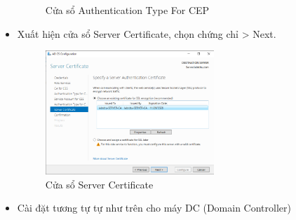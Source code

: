 \documentclass[13pt]{report}
\begin{document}
\begin{itemize}
\begin{figure}[htp]
			\caption{Cửa sổ Authentication Type For CEP}
		\end{figure}
		\newpage
		\item Xuất hiện cửa sổ Server Certificate, chọn chứng chỉ > Next.
		\begin{figure}[htp]
			\centering
			\includegraphics[width=0.6\textwidth]{image/Gui/ADCS/27.png}
			\caption{Cửa sổ Server Certificate}
		\end{figure}
		\item Cài đặt tương tự tự như trên cho máy DC (Domain Controller)

\end{itemize}
\end{document}
